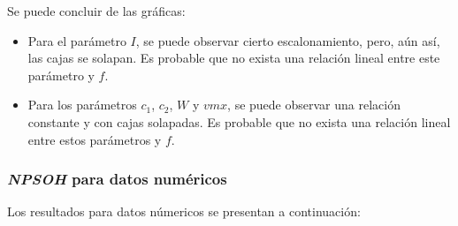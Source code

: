     Se puede concluir de las gráficas:
\begin{itemize}
    \item Para el parámetro $I$, se puede observar cierto escalonamiento,
pero, aún así, las cajas se solapan. Es probable que no exista una
relación lineal entre este parámetro y $f$.
    \item Para los parámetros $c_1$, $c_2$, $W$ y $vmx$, se puede
observar una relación constante y con cajas solapadas. Es probable
que no exista una relación lineal entre estos parámetros y $f$.
\end{itemize}

\subsubsection{\emph{NPSOH} para datos numéricos}

    Los resultados para datos númericos se presentan a continuación:

\begin{figure}[H]
  \centering
  \label{fig:f_pso_csv1}
\end{figure}

